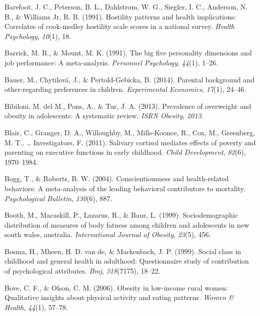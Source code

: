 \documentclass[man]{apa6}
\begin{document}
\leavevmode\hypertarget{ref-barefoot1991hostility}{}%
Barefoot, J. C., Peterson, B. L., Dahlstrom, W. G., Siegler, I. C., Anderson, N. B., \& Williams Jr, R. B. (1991). Hostility patterns and health implications: Correlates of cook-medley hostility scale scores in a national survey. \emph{Health Psychology}, \emph{10}(1), 18.

\leavevmode\hypertarget{ref-barrick1991big}{}%
Barrick, M. R., \& Mount, M. K. (1991). The big five personality dimensions and job performance: A meta-analysis. \emph{Personnel Psychology}, \emph{44}(1), 1--26.

\leavevmode\hypertarget{ref-bauer2014parental}{}%
Bauer, M., Chytilová, J., \& Pertold-Gebicka, B. (2014). Parental background and other-regarding preferences in children. \emph{Experimental Economics}, \emph{17}(1), 24--46.

\leavevmode\hypertarget{ref-bibiloni2013prevalence}{}%
Bibiloni, M. del M., Pons, A., \& Tur, J. A. (2013). Prevalence of overweight and obesity in adolescents: A systematic review. \emph{ISRN Obesity}, \emph{2013}.

\leavevmode\hypertarget{ref-blair2011salivary}{}%
Blair, C., Granger, D. A., Willoughby, M., Mills-Koonce, R., Cox, M., Greenberg, M. T., \ldots{} Investigators, F. (2011). Salivary cortisol mediates effects of poverty and parenting on executive functions in early childhood. \emph{Child Development}, \emph{82}(6), 1970--1984.

\leavevmode\hypertarget{ref-bogg2004conscientiousness}{}%
Bogg, T., \& Roberts, B. W. (2004). Conscientiousness and health-related behaviors: A meta-analysis of the leading behavioral contributors to mortality. \emph{Psychological Bulletin}, \emph{130}(6), 887.

\leavevmode\hypertarget{ref-booth1999sociodemographic}{}%
Booth, M., Macaskill, P., Lazarus, R., \& Baur, L. (1999). Sociodemographic distribution of measures of body fatness among children and adolescents in new south wales, australia. \emph{International Journal of Obesity}, \emph{23}(5), 456.

\leavevmode\hypertarget{ref-bosma1999social}{}%
Bosma, H., Mheen, H. D. van de, \& Mackenbach, J. P. (1999). Social class in childhood and general health in adulthood: Questionnaire study of contribution of psychological attributes. \emph{Bmj}, \emph{318}(7175), 18--22.

\leavevmode\hypertarget{ref-bove2006obesity}{}%
Bove, C. F., \& Olson, C. M. (2006). Obesity in low-income rural women: Qualitative insights about physical activity and eating patterns. \emph{Women \& Health}, \emph{44}(1), 57--78.
\end{document}
